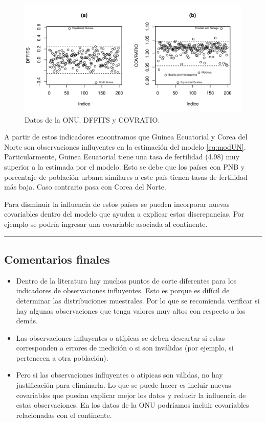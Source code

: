 \documentclass[
]{article}
\providecommand{\tightlist}{%
  \setlength{\itemsep}{0pt}\setlength{\parskip}{0pt}}
\begin{document}
\begin{figure}

{\centering \includegraphics{MLG1_files/figure-latex/UNdataOtros-1} 

}

\caption{Datos de la ONU. DFFITS y COVRATIO.}\label{fig:UNdataOtros}
\end{figure}

A partir de estos indicadores encontramos que Guinea Ecuatorial y Corea del Norte son observaciones influyentes en la estimación del modelo \eqref{eq:modUN}. Particularmente, Guinea Ecuatorial tiene una tasa de fertilidad (4.98) muy superior a la estimada por el modelo. Esto se debe que los países con PNB y porcentaje de población urbana similares a este país tienen tasas de fertilidad más baja. Caso contrario pasa con Corea del Norte.

Para disminuir la influencia de estos países se pueden incorporar nuevas covariables dentro del modelo que ayuden a explicar estas discrepancias. Por ejemplo se podría ingresar una covariable asociada al continente.

\rule{\textwidth}{0.4pt}

\hypertarget{comentarios-finales-1}{%
\subsection{Comentarios finales}\label{comentarios-finales-1}}

\begin{itemize}
\tightlist
\item
  Dentro de la literatura hay muchos puntos de corte diferentes para los indicadores de observaciones influyentes. Esto es porque es difícil de determinar las distribuciones muestrales. Por lo que se recomienda verificar si hay algunas observaciones que tenga valores muy altos con respecto a los demás.
\item
  Las observaciones influyentes o atípicas se deben descartar si estas corresponden a errores de medición o si son inválidas (por ejemplo, si pertenecen a otra población).
\item
  Pero si las observaciones influyentes o atípicas son válidas, no hay justificación para eliminarla. Lo que se puede hacer es incluir nuevas covariables que puedan explicar mejor los datos y reducir la influencia de estas observaciones. En los datos de la ONU podríamos incluir covariables relacionadas con el continente.
\end{itemize}

  
\end{document}
